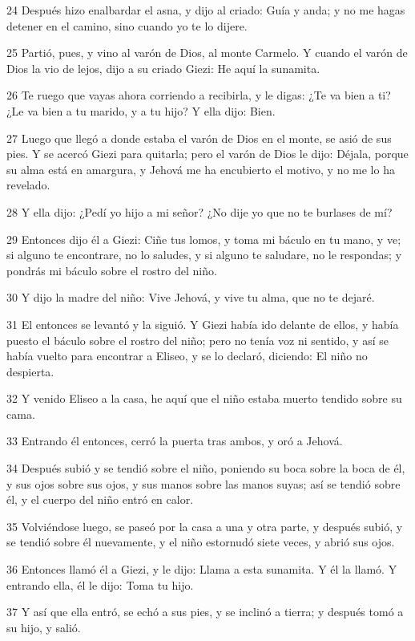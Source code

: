 \par 24 Después hizo enalbardar el asna, y dijo al criado: Guía y anda; y no me hagas detener en el camino, sino cuando yo te lo dijere.
\par 25 Partió, pues, y vino al varón de Dios, al monte Carmelo. Y cuando el varón de Dios la vio de lejos, dijo a su criado Giezi: He aquí la sunamita.
\par 26 Te ruego que vayas ahora corriendo a recibirla, y le digas: ¿Te va bien a ti? ¿Le va bien a tu marido, y a tu hijo? Y ella dijo: Bien.
\par 27 Luego que llegó a donde estaba el varón de Dios en el monte, se asió de sus pies. Y se acercó Giezi para quitarla; pero el varón de Dios le dijo: Déjala, porque su alma está en amargura, y Jehová me ha encubierto el motivo, y no me lo ha revelado.
\par 28 Y ella dijo: ¿Pedí yo hijo a mi señor? ¿No dije yo que no te burlases de mí?
\par 29 Entonces dijo él a Giezi: Ciñe tus lomos, y toma mi báculo en tu mano, y ve; si alguno te encontrare, no lo saludes, y si alguno te saludare, no le respondas; y pondrás mi báculo sobre el rostro del niño.
\par 30 Y dijo la madre del niño: Vive Jehová, y vive tu alma, que no te dejaré.
\par 31 El entonces se levantó y la siguió. Y Giezi había ido delante de ellos, y había puesto el báculo sobre el rostro del niño; pero no tenía voz ni sentido, y así se había vuelto para encontrar a Eliseo, y se lo declaró, diciendo: El niño no despierta.
\par 32 Y venido Eliseo a la casa, he aquí que el niño estaba muerto tendido sobre su cama.
\par 33 Entrando él entonces, cerró la puerta tras ambos, y oró a Jehová.
\par 34 Después subió y se tendió sobre el niño, poniendo su boca sobre la boca de él, y sus ojos sobre sus ojos, y sus manos sobre las manos suyas; así se tendió sobre él, y el cuerpo del niño entró en calor.
\par 35 Volviéndose luego, se paseó por la casa a una y otra parte, y después subió, y se tendió sobre él nuevamente, y el niño estornudó siete veces, y abrió sus ojos.
\par 36 Entonces llamó él a Giezi, y le dijo: Llama a esta sunamita. Y él la llamó. Y entrando ella, él le dijo: Toma tu hijo.
\par 37 Y así que ella entró, se echó a sus pies, y se inclinó a tierra; y después tomó a su hijo, y salió.

